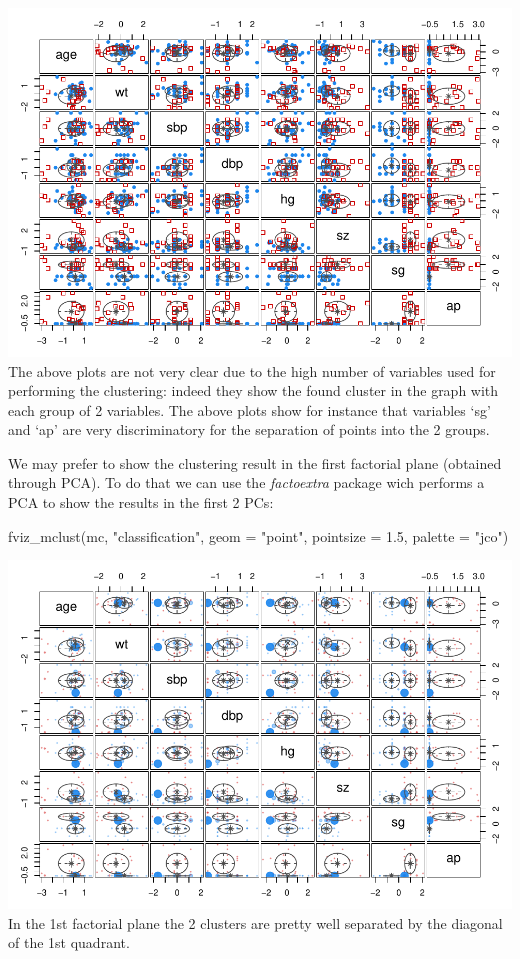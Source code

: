 \documentclass[
]{article}
\newenvironment{Shaded}{\begin{snugshade}}{\end{snugshade}}
\newcommand{\AttributeTok}[1]{\textcolor[rgb]{0.77,0.63,0.00}{#1}}
\newcommand{\FloatTok}[1]{\textcolor[rgb]{0.00,0.00,0.81}{#1}}
\newcommand{\FunctionTok}[1]{\textcolor[rgb]{0.00,0.00,0.00}{#1}}
\newcommand{\NormalTok}[1]{#1}
\newcommand{\StringTok}[1]{\textcolor[rgb]{0.31,0.60,0.02}{#1}}
\begin{document}
\includegraphics{clustering_files/figure-latex/unnamed-chunk-82-1.pdf}
The above plots are not very clear due to the high number of variables
used for performing the clustering: indeed they show the found cluster
in the graph with each group of 2 variables. The above plots show for
instance that variables `sg' and `ap' are very discriminatory for the
separation of points into the 2 groups.

We may prefer to show the clustering result in the first factorial plane
(obtained through PCA). To do that we can use the \emph{factoextra}
package wich performs a PCA to show the results in the first 2 PCs:

\begin{Shaded}
\begin{Highlighting}[]
\FunctionTok{fviz\_mclust}\NormalTok{(mc, }\StringTok{"classification"}\NormalTok{, }\AttributeTok{geom =} \StringTok{"point"}\NormalTok{, }
            \AttributeTok{pointsize =} \FloatTok{1.5}\NormalTok{, }\AttributeTok{palette =} \StringTok{"jco"}\NormalTok{)}
\end{Highlighting}
\end{Shaded}

\includegraphics{clustering_files/figure-latex/unnamed-chunk-83-1.pdf}
In the 1st factorial plane the 2 clusters are pretty well separated by
the diagonal of the 1st quadrant.
\end{document}
